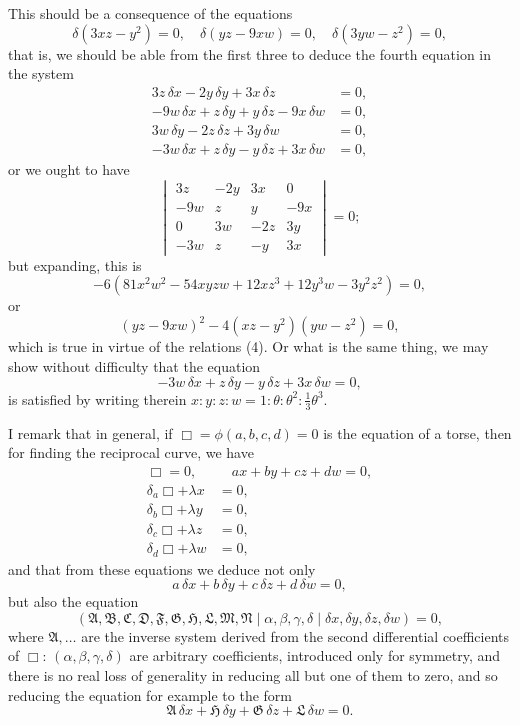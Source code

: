 \documentclass[11pt]{article}
\begin{document}
This should be a consequence of the equations
\[ \delta(3xz - y^2) = 0,\quad \delta(yz - 9xw) = 0,\quad \delta(3yw - z^2) = 0, \]
that is, we should be able from the first three to deduce the fourth equation in the system
\begin{align*}
3z\,\delta x - 2y\,\delta y + 3x\,\delta z &= 0,\\
-9w\,\delta x + z\,\delta y + y\,\delta z - 9x\,\delta w &= 0,\\
3w\,\delta y - 2z\,\delta z + 3y\,\delta w &= 0,\\
-3w\,\delta x + z\,\delta y - y\,\delta z + 3x\,\delta w &= 0,
\end{align*}
or we ought to have
\[ \begin{vmatrix} 3z & -2y & 3x & 0 \\ -9w & z & y & -9x \\ 0 & 3w & -2z & 3y \\ -3w & z & -y & 3x \end{vmatrix} = 0; \]
but expanding, this is
\[ -6(81 x^2 w^2 - 54xyzw + 12 xz^3 + 12 y^3 w - 3y^2 z^2) = 0, \]
or
\[ (yz - 9xw)^2 - 4(xz - y^2)(yw - z^2) = 0, \]
which is true in virtue of the relations (4). Or what is the same thing, we may show without difficulty that the equation
\[ -3w\,\delta x + z\,\delta y - y\,\delta z + 3x\,\delta w = 0, \]
is satisfied by writing therein $x : y : z : w = 1 : \theta : \theta^2 : \tfrac{1}{3}\theta^3$.

I remark that in general, if $\Box = \phi(a,b,c,d) = 0$ is the equation of a torse, then for finding the reciprocal curve, we have
\begin{align*}
\Box = 0,&\quad ax + by + cz + dw = 0,\\
\delta_a\Box + \lambda x &= 0,\\
\delta_b\Box + \lambda y &= 0,\\
\delta_c\Box + \lambda z &= 0,\\
\delta_d\Box + \lambda w &= 0,
\end{align*}
and that from these equations we deduce not only
\[ a\,\delta x + b\,\delta y + c\,\delta z + d\,\delta w = 0, \]
but also the equation
\[ (\mathfrak{A},\mathfrak{B},\mathfrak{C},\mathfrak{D},\mathfrak{F},\mathfrak{G},\mathfrak{H},\mathfrak{L},\mathfrak{M},\mathfrak{N} \mid \alpha,\beta,\gamma,\delta \mid \delta x, \delta y, \delta z, \delta w) = 0, \]
where $\mathfrak{A},\ldots$ are the inverse system derived from the second differential coefficients of $\Box$: $(\alpha,\beta,\gamma,\delta)$ are arbitrary coefficients, introduced only for symmetry, and there is no real loss of generality in reducing all but one of them to zero, and so reducing the equation for example to the form
\[ \mathfrak{A}\,\delta x + \mathfrak{H}\,\delta y + \mathfrak{G}\,\delta z + \mathfrak{L}\,\delta w = 0. \]
\end{document}
